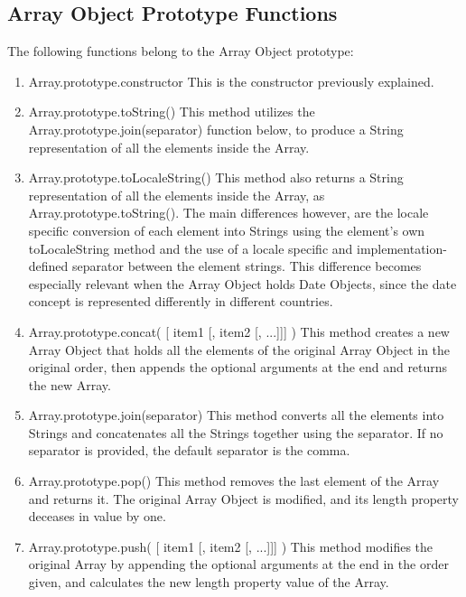 \documentclass[a4paper,11pt,twoside]{report}
\begin{document}
\subsection{Array Object Prototype Functions}
The following functions belong to the Array Object prototype: 
\begin{enumerate}
\item Array.prototype.constructor \newline
This is the constructor previously explained.

\item Array.prototype.toString() \newline
This method utilizes the Array.prototype.join(separator) function below, to produce a String representation of all the elements inside the Array.

\item Array.prototype.toLocaleString() \newline
This method also returns a String representation of all the elements inside the Array, as Array.prototype.toString(). The main differences however, are the locale specific conversion of each element into Strings using the element's own toLocaleString method and the use of a locale specific and implementation-defined separator between the element strings. This difference becomes especially relevant when the Array Object holds Date Objects, since the date concept is represented differently in different countries.

\item Array.prototype.concat( [ item1 [, item2 [, ...]]] ) \newline
This method creates a new Array Object that holds all the elements of the original Array Object in the original order, then appends the optional arguments at the end and returns the new Array.

\item Array.prototype.join(separator) \newline
This method converts all the elements into Strings and concatenates all the Strings together using the separator. If no separator is provided, the default separator is the comma.

\item Array.prototype.pop() \newline
This method removes the last element of the Array and returns it. The original Array Object is modified, and its length property deceases in value by one.

\item Array.prototype.push( [ item1 [, item2 [, ...]]] ) \newline
This method modifies the original Array by appending the optional arguments at the end in the order given, and calculates the new length property value of the Array.


\end{enumerate}
\end{document}
